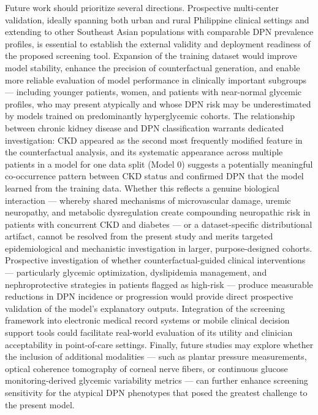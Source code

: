 \documentclass[pdflatex,sn-vancouver-num]{sn-jnl}
\begin{document}
Future work should prioritize several directions. Prospective multi-center validation, ideally spanning both urban and rural Philippine clinical settings and extending to other Southeast Asian populations with comparable DPN prevalence profiles, is essential to establish the external validity and deployment readiness of the proposed screening tool. Expansion of the training dataset would improve model stability, enhance the precision of counterfactual generation, and enable more reliable evaluation of model performance in clinically important subgroups — including younger patients, women, and patients with near-normal glycemic profiles, who may present atypically and whose DPN risk may be underestimated by models trained on predominantly hyperglycemic cohorts. The relationship between chronic kidney disease and DPN classification warrants dedicated investigation: CKD appeared as the second most frequently modified feature in the counterfactual analysis, and its systematic appearance across multiple patients in a model for one data split (Model 0) suggests a potentially meaningful co-occurrence pattern between CKD status and confirmed DPN that the model learned from the training data. Whether this reflects a genuine biological interaction — whereby shared mechanisms of microvascular damage, uremic neuropathy, and metabolic dysregulation create compounding neuropathic risk in patients with concurrent CKD and diabetes — or a dataset-specific distributional artifact, cannot be resolved from the present study and merits targeted epidemiological and mechanistic investigation in larger, purpose-designed cohorts. Prospective investigation of whether counterfactual-guided clinical interventions — particularly glycemic optimization, dyslipidemia management, and nephroprotective strategies in patients flagged as high-risk — produce measurable reductions in DPN incidence or progression would provide direct prospective validation of the model's explanatory outputs. Integration of the screening framework into electronic medical record systems or mobile clinical decision support tools could facilitate real-world evaluation of its utility and clinician acceptability in point-of-care settings. Finally, future studies may explore whether the inclusion of additional modalities — such as plantar pressure measurements, optical coherence tomography of corneal nerve fibers, or continuous glucose monitoring-derived glycemic variability metrics — can further enhance screening sensitivity for the atypical DPN phenotypes that posed the greatest challenge to the present model.
\end{document}
